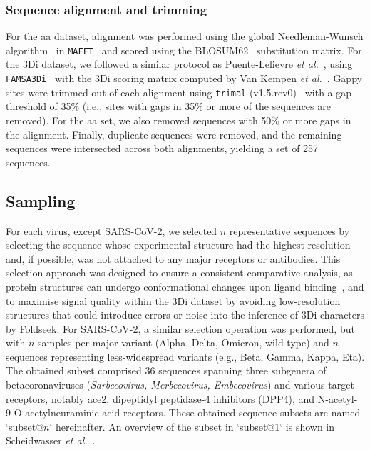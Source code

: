 \subsubsection{Sequence alignment and trimming}

For the \gls{aa} dataset, alignment was performed using the global Needleman-Wunsch algorithm~\cite{needleman1970} in \texttt{MAFFT}~\cite{katoh2013, katoh2016} and scored using the BLOSUM62~\cite{henikoff1992} substitution matrix. For the 3Di dataset, we followed a similar protocol as Puente-Lelievre \textit{et al.}~\cite{puente2023}, using \texttt{FAMSA3Di}~\cite{puente2023} with the 3Di scoring matrix computed by Van Kempen \textit{et al.}~\cite{vankempen2024}. Gappy sites were trimmed out of each alignment using \texttt{trimal} (v1.5.rev0)~\cite{capella2009} with a gap threshold of 35\% (i.e., sites with gaps in 35\% or more of the sequences are removed). For the \gls{aa} set, we also removed sequences with 50\% or more gaps in the alignment. Finally, duplicate sequences were removed, and the remaining sequences were intersected across both alignments, yielding a set of 257 sequences.

\subsection{Sampling}


For each virus, except SARS-CoV-2, we selected $n$ representative sequences by selecting the sequence whose experimental structure had the highest resolution and, if possible, was not attached to any major receptors or antibodies. This selection approach was designed to ensure a consistent comparative analysis, as protein structures can undergo conformational changes upon ligand binding~\cite{pronker2023, hasse2024}, and to maximise signal quality within the 3Di dataset by avoiding low-resolution structures that could introduce errors or noise into the inference of 3Di characters by Foldseek. For SARS-CoV-2, a similar selection operation was performed, but with $n$ samples per major variant (Alpha, Delta, Omicron, wild type) and $n$ sequences representing less-widespread variants (e.g., Beta, Gamma, Kappa, Eta). The obtained subset comprised 36 sequences spanning three subgenera of betacoronaviruses (\textit{Sarbecovirus, Merbecovirus, Embecovirus}) and various target receptors, notably \gls{ace2}, dipeptidyl peptidase-4 inhibitors (DPP4), and N-acetyl-9-O-acetylneuraminic acid receptors. These obtained sequence subsets are named `subset@$n$` hereinafter. An overview of the subset in `subset@1` is shown in Scheidwasser \textit{et al.}~\cite{scheidwasser2025a}.

